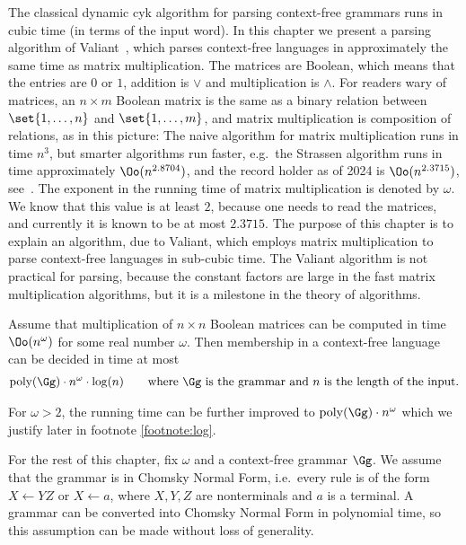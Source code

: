 The classical dynamic {\sc cyk} algorithm for parsing context-free grammars runs in cubic time (in terms of the input word). 
In this chapter we present a parsing algorithm of  Valiant~\cite{Valiant:1975bn}, which parses  context-free languages  in approximately the same time as matrix multiplication.  The matrices are  Boolean, which means that the entries are $0$ or $1$, addition  is $\lor$ and multiplication is $\land$. For readers wary of matrices, an $n \times m$ Boolean matrix is the same as a binary relation between $\set{1,\ldots,n}$ and $\set{1,\ldots,m}$, and matrix multiplication is composition of relations, as in  this picture:
The naive algorithm for matrix multiplication runs in time $n^3$, but smarter algorithms run faster, e.g.~the Strassen algorithm runs in time approximately $\Oo(n^{2.8704})$, and the record holder as of  2024 is $\Oo(n^{2.3715})$, see~\cite{williams2024new}. The exponent in the running time of matrix multiplication is denoted by $\omega$. We know that this value is at least $2$, because one needs to read the matrices, and currently it is known to be at most $2.3715$.  The purpose of this chapter is to explain an algorithm, due to Valiant, which employs matrix multiplication to parse context-free languages in sub-cubic time.  The Valiant algorithm is not practical for parsing, because the constant factors are large in the fast matrix multiplication algorithms, but it is a milestone in the theory of algorithms.

\begin{theorem}
	\label{thm:valiant}
	Assume that  multiplication of $n \times n$ Boolean matrices can be computed in time $\Oo(n^\omega)$ for some real number $\omega$. Then membership in a context-free language can be decided in time at most
	\begin{align*}
\mathrm{poly}(\Gg) \cdot n^\omega \cdot \log(n) \qquad \text{where $\Gg$ is the grammar and $n$ is the length of the input.}\end{align*}
\end{theorem}
For $\omega > 2$, the running time can be further improved to
$
\mathrm{poly}(\Gg) \cdot n^\omega
$
which we justify later in footnote \ref{footnote:log}.

For the rest of this chapter, fix $\omega$ and a context-free grammar $\Gg$. We assume that the grammar is in Chomsky Normal Form, i.e.~every rule is of the form $X \leftarrow YZ$ or $X \leftarrow a$, where $X,Y,Z$ are nonterminals and $a$ is a terminal. A grammar can be converted into Chomsky Normal Form in polynomial time, so this assumption can be made without loss of generality. 
\newcommand{\ptrip}[3]{#1 \stackrel {#2} \to #3}

